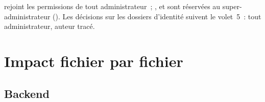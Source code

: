  rejoint les permissions de tout administrateur~; ,
 et  sont réservées au super-administrateur
(). Les décisions sur les dossiers d'identité suivent le
volet~5~: tout administrateur, auteur tracé.

\chapter{Impact fichier par fichier}

\section{Backend}

